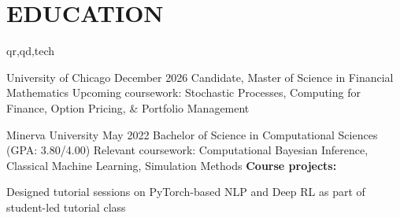 \section{EDUCATION}
\begin{rolecontent}{qr,qd,tech}
\begin{education_xp}[Chicago, IL]
                   {University of Chicago}
                   {December 2026}
                   {Candidate, Master of Science in Financial Mathematics}
    Upcoming coursework: Stochastic Processes, Computing for Finance, Option Pricing, \& Portfolio Management
    \begin{highlights}
    \end{highlights}
\end{education_xp}
\end{rolecontent}
\vspace{0.1 cm}
\begin{education_xp}
                   {Minerva University}
                   {May 2022}
                   {Bachelor of Science in Computational Sciences (GPA: 3.80/4.00)}
    Relevant coursework: Computational Bayesian Inference, Classical Machine Learning, Simulation Methods\newline
    \textbf{Course projects:}
    \begin{highlights}
        \item Designed tutorial sessions on PyTorch-based NLP and Deep RL as part of student-led tutorial class
    \end{highlights}
\end{education_xp}

